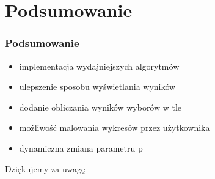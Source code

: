 \documentclass{beamer}
\begin{document}
\section{Podsumowanie}
\begin{frame}
\frametitle{Podsumowanie}
\begin{multicols}{2}
\begin{itemize}
\item implementacja wydajniejszych algorytmów
\item ulepszenie sposobu wyświetlania wyników
\item dodanie obliczania wyników wyborów w tle
\item możliwość malowania wykresów przez użytkownika
\item dynamiczna zmiana parametru p
\end{itemize}
\end{multicols}
\end{frame}

\begin{frame}
\Huge{\centerline{Dziękujemy za uwagę}}
\end{frame}

\end{document}
